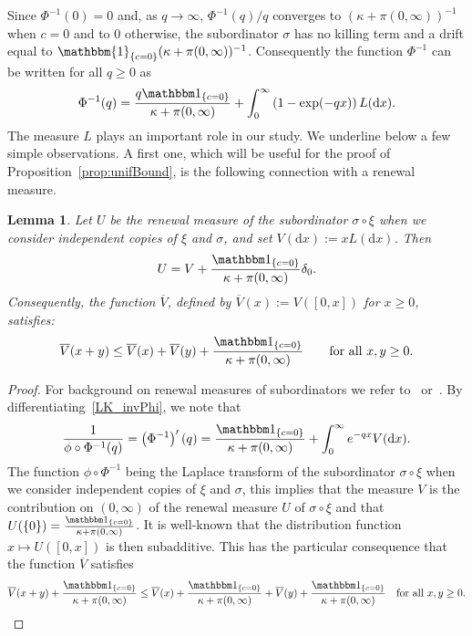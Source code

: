 \documentclass[10pt]{amsart}
\newtheorem{lemm}[theo]{Lemma}
\theoremstyle{definition}
\numberwithin{equation}{section}
\newcommand{\dd}{\mathrm{d}}
\newcommand{\ind}[1]{\mathbbm{1}_{\left\{#1\right\}}}
\renewcommand{\bar}[1]{\overline{#1}}
\begin{document}
Since $\Phi^{-1}(0)=0$ and, as $q\rightarrow \infty$, $\Phi^{-1}(q)/q$ converges to $(\kappa+\pi(0,\infty))^{-1}$ when $c=0$ and to $0$ otherwise, the subordinator $\sigma$ has no killing term and a drift equal to $\ind{c=0}(\kappa+\pi(0,\infty))^{-1}$. Consequently the function $\Phi^{-1}$ can be written for all $q\geq 0$ as
\begin{equation}\label{LK_invPhi}
\Phi^{-1}(q)=\frac{q \mathbbm 1_{\{c=0\}}}{\kappa+\pi(0,\infty)}+\int_0^{\infty} \left(1-\exp(-qx)\right)L(\dd x).
\end{equation}
The measure $L$ plays an important role in our study. We underline below a few simple observations. A first one, which will be useful for the proof of Proposition~\ref{prop:unifBound}, is the following connection with a renewal measure.


\begin{lemm}\label{lem:renew}
Let $U$ be the renewal measure of the subordinator $\sigma \circ \xi$ when we consider independent copies of $\xi$ and $\sigma$, and set $V(\dd x):=xL(\dd x)$. Then
\[
U=V + \frac{\mathbbm 1_{\{c=0\}}}{\kappa+\pi(0,\infty)} \delta_0.
\]
Consequently, the function $\bar V$, defined by $\bar V(x):=V([0,x])$ for $x \geq 0$, satisfies:
\[
\bar V(x+y)\leq \bar V(x)+ \bar V(y) + \frac{\mathbbm 1_{\{c=0\}}}{\kappa+\pi(0,\infty)} \qquad \text{for all } x,y \geq 0.
\]
\end{lemm}

\begin{proof}
For background on renewal measures of subordinators we refer to~\cite[Chapter~3]{BLevy} or~\cite[Chapter~5]{KypFluctu}. By differentiating~\eqref{LK_invPhi}, we note that
\[
\frac{1}{\phi \circ \Phi^{-1}(q)}=\left(\Phi^{-1}\right)'(q)=\frac{\mathbbm 1_{\{c=0\}}}{\kappa+\pi(0,\infty)}+ \int_0^{\infty} e^{-qx} V(\dd x).
\]
The function $\phi \circ \Phi^{-1}$ being the Laplace transform of the subordinator $\sigma \circ \xi$ when we consider independent copies of $\xi$ and $\sigma$, this implies that the measure $V$ is the contribution on $(0,\infty)$ of the renewal measure $U$ of $\sigma \circ \xi$ and that $U(\{0\})=\frac{\mathbbm 1_{\{c=0\}}}{\kappa+\pi(0,\infty)}$. It is well-known that the distribution function $x \mapsto U([0,x])$ is then subadditive. This has the particular consequence that the function $\bar V$ satisfies
\[
\bar V(x+y)+ \frac{\mathbbm 1_{\{c=0\}}}{\kappa+\pi(0,\infty)} \leq \bar V(x)+ \frac{\mathbbm 1_{\{c=0\}}}{\kappa+\pi(0,\infty)}+ \bar V(y) + \frac{\mathbbm 1_{\{c=0\}}}{\kappa+\pi(0,\infty)} \quad \text{for all } x,y \geq 0. \qedhere
\]
\end{proof}
\end{document}
